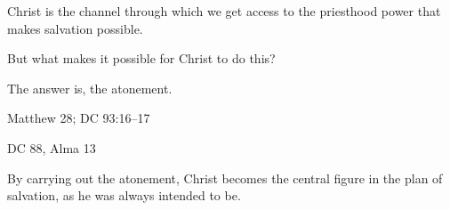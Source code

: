 \begin{compactitem}
\begin{compactitem}
\begin{compactitem}
							\item Christ is the channel through which we get access to the priesthood power that makes salvation possible.
							\item But what makes it possible for Christ to do this?
							\item The answer is, the atonement.
							\item Matthew 28; DC 93:16--17
							\item DC 88, Alma 13
						\end{compactitem}
				\end{compactitem}
			
			\item By carrying out the atonement, Christ becomes the central figure in the plan of salvation, as he was always intended to be.
			

\end{compactitem}
